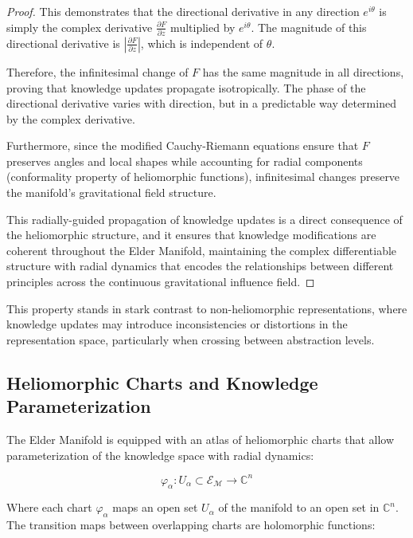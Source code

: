 \begin{proof}
This demonstrates that the directional derivative in any direction $e^{i\theta}$ is simply the complex derivative $\frac{\partial F}{\partial z}$ multiplied by $e^{i\theta}$. The magnitude of this directional derivative is $\left|\frac{\partial F}{\partial z}\right|$, which is independent of $\theta$.

Therefore, the infinitesimal change of $F$ has the same magnitude in all directions, proving that knowledge updates propagate isotropically. The phase of the directional derivative varies with direction, but in a predictable way determined by the complex derivative.

Furthermore, since the modified Cauchy-Riemann equations ensure that $F$ preserves angles and local shapes while accounting for radial components (conformality property of heliomorphic functions), infinitesimal changes preserve the manifold's gravitational field structure.

This radially-guided propagation of knowledge updates is a direct consequence of the heliomorphic structure, and it ensures that knowledge modifications are coherent throughout the Elder Manifold, maintaining the complex differentiable structure with radial dynamics that encodes the relationships between different principles across the continuous gravitational influence field.
\end{proof}

This property stands in stark contrast to non-heliomorphic representations, where knowledge updates may introduce inconsistencies or distortions in the representation space, particularly when crossing between abstraction levels.

\subsection{Heliomorphic Charts and Knowledge Parameterization}

The Elder Manifold is equipped with an atlas of heliomorphic charts that allow parameterization of the knowledge space with radial dynamics:

\begin{equation}
\varphi_{\alpha}: U_{\alpha} \subset \mathcal{E}_{\mathcal{M}} \rightarrow \mathbb{C}^n
\end{equation}

Where each chart $\varphi_{\alpha}$ maps an open set $U_{\alpha}$ of the manifold to an open set in $\mathbb{C}^n$. The transition maps between overlapping charts are holomorphic functions:

